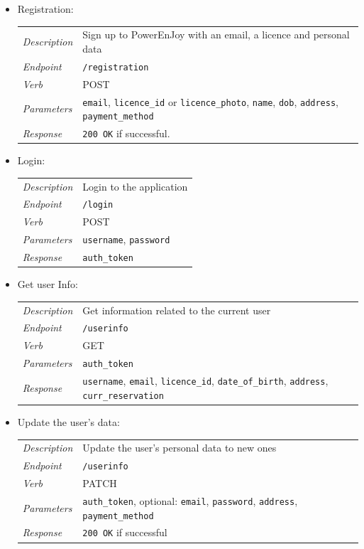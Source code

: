 \documentclass[english]{article}
\newcommand{\code}[1]{\texttt{#1}}
\begin{document}
\begin{itemize}
	\item{Registration:}\\
	\begin{tabular}{ | l l }
		\textit{Description} & Sign up to PowerEnJoy with an email, a licence and personal data \\
		\textit{Endpoint} & \code{/registration} \\ 
		\textit{Verb} & POST \\  
		\textit{Parameters} & \code{email}, \code{licence\_id} or \code{licence\_photo}, \code{name}, \code{dob}, \code{address}, \code{payment\_method} \\
		\textit{Response} & \code{200 OK} if successful.		
	\end{tabular}
	
	\item{Login:}\\
	\begin{tabular}{ | l l }
		\textit{Description} & Login to the application \\
		\textit{Endpoint} & \code{/login} \\ 
		\textit{Verb} & POST \\  
		\textit{Parameters} & \code{username}, \code{password} \\
		\textit{Response} & \code{auth\_token}
	\end{tabular}
	
	\item{Get user Info:}\\
		\begin{tabular}{ | l l }
			\textit{Description} & Get information related to the current user\\
			\textit{Endpoint} & \code{/userinfo} \\ 
			\textit{Verb} & GET \\  
			\textit{Parameters} & \code{auth\_token} \\
			\textit{Response} & \code{username}, \code{email}, \code{licence\_id}, \code{date\_of\_birth},  \code{address}, \code{curr\_reservation}
		\end{tabular}
	
	\item{Update the user's data:}\\
	\begin{tabular}{ | l l }
		\textit{Description} & Update the user's personal data to new ones\\
		\textit{Endpoint} & \code{/userinfo} \\ 
		\textit{Verb} & PATCH \\  
		\textit{Parameters} & \code{auth\_token}, optional: \code{email}, \code{password}, \code{address}, \code{payment\_method}  \\
		\textit{Response} & \code{200 OK} if successful
	\end{tabular}


\end{itemize}
\end{document}
